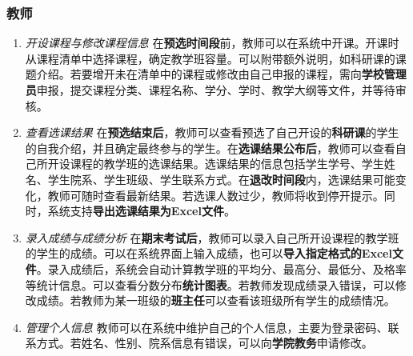 \subsubsection{教师}
\begin{enumerate}
    \item \textit{开设课程与修改课程信息} \quad 在\textbf{预选时间段}前，教师可以在系统中开课。开课时从课程清单中选择课程，确定教学班容量。可以附带额外说明，如科研课的课题介绍。若要增开未在清单中的课程或修改由自己申报的课程，需向\textbf{学校管理员}申报，提交课程分类、课程名称、学分、学时、教学大纲等文件，并等待审核。
    \item \textit{查看选课结果} \quad 在\textbf{预选结束后}，教师可以查看预选了自己开设的\textbf{科研课}的学生的自我介绍，并且确定最终参与的学生。在\textbf{选课结果公布后}，教师可以查看自己所开设课程的教学班的选课结果。选课结果的信息包括学生学号、学生姓名、学生院系、学生班级、学生联系方式。在\textbf{退改时间段}内，选课结果可能变化，教师可随时查看最新结果。若选课人数过少，教师将收到停开提示。同时，系统支持\textbf{导出选课结果为Excel文件}。
    \item \textit{录入成绩与成绩分析} \quad 在\textbf{期末考试后}，教师可以录入自己所开设课程的教学班的学生的成绩。可以在系统界面上输入成绩，也可以\textbf{导入指定格式的Excel文件}。录入成绩后，系统会自动计算教学班的平均分、最高分、最低分、及格率等统计信息。可以查看分数分布\textbf{统计图表}。若教师发现成绩录入错误，可以修改成绩。若教师为某一班级的\textbf{班主任}可以查看该班级所有学生的成绩情况。
    \item \textit{管理个人信息} \quad 教师可以在系统中维护自己的个人信息，主要为登录密码、联系方式。若姓名、性别、院系信息有错误，可以向\textbf{学院教务}申请修改。
\end{enumerate}

